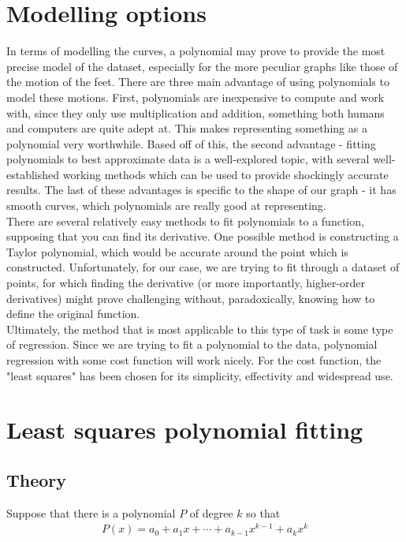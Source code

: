 \documentclass[12pt, a4paper]{article}
\begin{document}
\section{Modelling options}
In terms of modelling the curves, a polynomial may prove to provide the most
precise model of the dataset, especially for the more peculiar graphs like those
of the motion of the feet. There are three main advantage of using polynomials
to model these motions. First, polynomials are inexpensive to compute and work
with, since they only use multiplication and addition, something both humans and
computers are quite adept at. This makes representing something as a polynomial
very worthwhile. Based off of this, the second advantage - fitting polynomials
to best approximate data is a well-explored topic, with several well-established
working methods which can be used to provide shockingly accurate results. The
last of these advantages is specific to the shape of our graph - it has smooth
curves, which polynomials are really good at representing. \\

There are several relatively easy methods to fit polynomials to a function,
supposing that you can find its derivative. One possible method is constructing
a Taylor polynomial, which would be accurate around the point which is
constructed. Unfortunately, for our case, we are trying to fit through a dataset
of points, for which finding the derivative (or more importantly, higher-order
derivatives) might prove challenging without, paradoxically, knowing how to
define the original function. \\

Ultimately, the method that is most applicable to this type of task is some type
of regression. Since we are trying to fit a polynomial to the data, polynomial
regression with some cost function will work nicely. For the cost function, the
"least squares" has been chosen for its simplicity, effectivity and widespread
use. \\

\section{Least squares polynomial fitting}
\subsection{Theory}
Suppose that there is a polynomial $P$ of degree $k$ so that
\begin{align*}
    P(x)= a_0 + a_1 x + \cdots + a_{k-1} x^{k-1} + a_k x^k
\end{align*}
\end{document}
